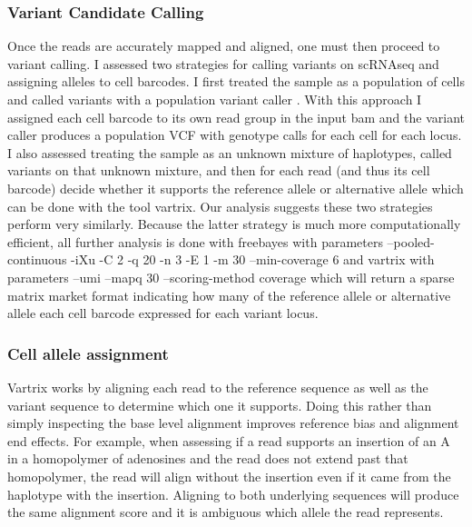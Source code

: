 \subsubsection{Variant Candidate Calling}
\par{
Once the reads are accurately mapped and aligned, one must then proceed to variant calling. I assessed two strategies for calling variants on scRNAseq and assigning alleles to cell barcodes. I first treated 
the sample as a population of cells and called variants with a population variant caller\cite{freebayes} \cite{gatk} \cite{samtools}. With this approach I assigned each cell barcode to its own read group in the input bam and the variant caller produces a population VCF with genotype calls for each cell for each locus.
I also assessed treating the sample as an unknown mixture of haplotypes, called variants on that unknown mixture, and then for each read (and thus its cell barcode) decide whether it supports the reference allele or alternative allele which can be done with the tool vartrix\cite{vartrix}. Our analysis suggests these two strategies perform very similarly. Because the latter strategy is much more computationally efficient, all further analysis is done with freebayes with parameters --pooled-continuous -iXu -C 2 -q 20 -n 3 -E 1 -m 30 --min-coverage 6 and vartrix with parameters  --umi --mapq 30 --scoring-method coverage which will return a sparse matrix market format indicating how many of the reference allele or alternative allele each cell barcode expressed for each variant locus.
}
\subsubsection{Cell allele assignment}
\par{
 Vartrix works by aligning each read to the reference sequence as well as the variant sequence to determine which one it supports. Doing this rather than simply inspecting the base level alignment improves reference bias and alignment end effects. For example, when assessing if a read supports an insertion of an A in a homopolymer of adenosines and the read does not extend past that homopolymer, the read will align without the insertion even if it came from the haplotype with the insertion. Aligning to both underlying sequences will produce the same alignment score and it is ambiguous which allele the read represents.
}
